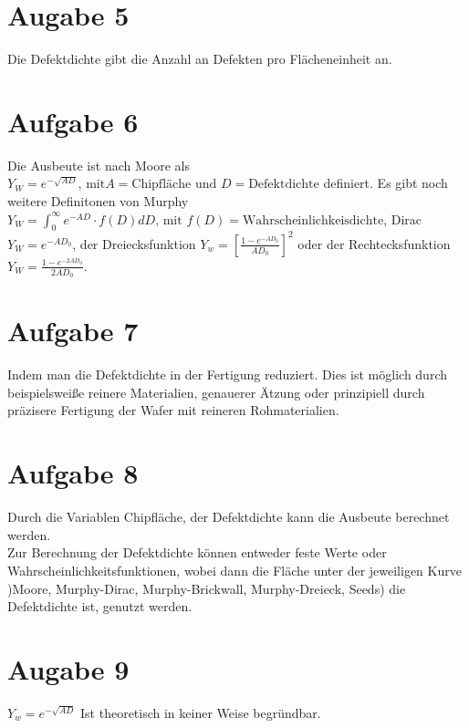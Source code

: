 \documentclass[a4paper]{scrartcl}
\begin{document}
\section*{Augabe 5}
Die Defektdichte gibt die Anzahl an Defekten pro Flächeneinheit an.


\section*{Aufgabe 6}
Die Ausbeute ist nach Moore als $Y_W = e^{-\sqrt{AD}} \text{, mit} A=\text{Chipfläche und } D=\text{Defektdichte}$ definiert. Es gibt noch weitere Definitonen von Murphy $Y_W = \int_0^{\infty} e^{-AD} \cdot f(D)dD \text{, mit }f(D)=\text{Wahrscheinlichkeisdichte}$, Dirac $Y_W=e^{-AD_0}$, der Dreiecksfunktion $Y_w=[ \frac{1-e^{-AD_0}}{AD_0} ]^2$ oder der Rechtecksfunktion $Y_W=\frac{1-e^{-2AD_0}}{2AD_0}$.


\section*{Aufgabe 7}
Indem man die Defektdichte in der Fertigung reduziert. Dies ist möglich durch beispielsweiße reinere Materialien, genauerer Ätzung oder prinzipiell durch präzisere Fertigung  der Wafer mit reineren Rohmaterialien.


\section*{Aufgabe 8}
Durch die Variablen Chipfläche, der Defektdichte kann die Ausbeute berechnet werden.\\
Zur Berechnung der Defektdichte können entweder feste Werte oder Wahrscheinlichkeitsfunktionen, wobei dann die Fläche unter der jeweiligen Kurve )Moore, Murphy-Dirac, Murphy-Brickwall, Murphy-Dreieck, Seeds) die Defektdichte ist, genutzt werden.

\section*{Augabe 9}
$Y_w = e^{-\sqrt{AD}}$
Ist theoretisch in keiner Weise begründbar.
\end{document}
